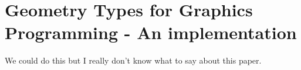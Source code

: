 \section{Geometry Types for Graphics Programming - An implementation}

We could do this but I really don't know what to say about this paper.